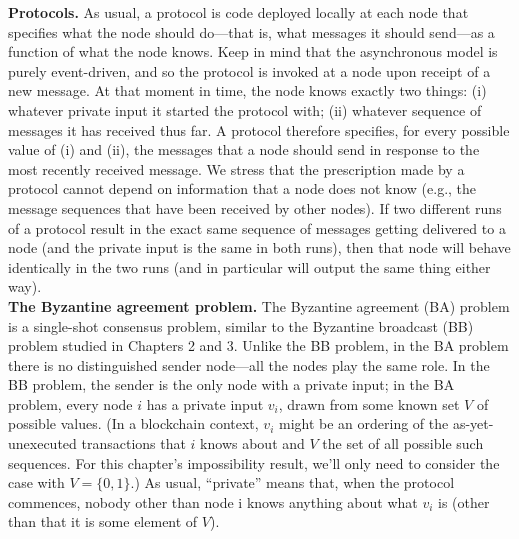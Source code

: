 \noindent
\textbf{Protocols.} As usual, a protocol is code deployed locally at each node that specifies what
the node should do—that is, what messages it should send—as a function of what the
node knows. Keep in mind that the asynchronous model is purely event-driven, and so the
protocol is invoked at a node upon receipt of a new message. At that moment in time, the node knows exactly two things: (i) whatever private input it started the protocol with; (ii) whatever sequence of messages it has received thus far. A protocol therefore specifies, for
every possible value of (i) and (ii), the messages that a node should send in response to the
most recently received message. We stress that the prescription made by a protocol cannot
depend on information that a node does not know (e.g., the message sequences that have
been received by other nodes). If two different runs of a protocol result in the exact same
sequence of messages getting delivered to a node (and the private input is the same in both
runs), then that node will behave identically in the two runs (and in particular will output
the same thing either way).\\

\noindent
\textbf{The Byzantine agreement problem.} The Byzantine agreement (BA) problem is a
single-shot consensus problem, similar to the Byzantine broadcast (BB) problem studied
in Chapters 2 and 3. Unlike the BB problem, in the BA problem there is no distinguished
sender node—all the nodes play the same role. In the BB problem, the sender is the only
node with a private input; in the BA problem, every node $i$ has a private input $v_i$, drawn
from some known set $V$ of possible values. (In a blockchain context, $v_i$ might be an ordering of the as-yet-unexecuted transactions that $i$ knows about and $V$ the set of all possible such sequences. For this chapter’s impossibility result, we’ll only need to consider the case
with $V = \{0, 1\}$.) As usual, “private” means that, when the protocol commences, nobody
other than node i knows anything about what $v_i$ is (other than that it is some element of $V$).\\

